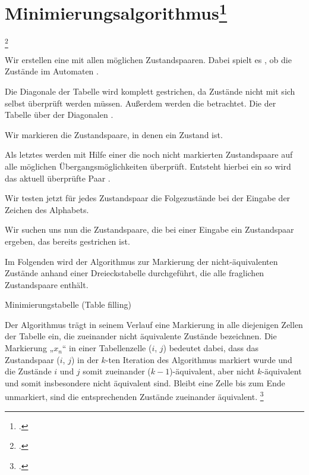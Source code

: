 \documentclass{lehramt-informatik-haupt}
\begin{document}

\section{Minimierungsalgorithmus\footcite[Seite 47-57]{vossen}}

\footcite[Seite 51-62]{theo:fs:1}

Wir erstellen eine  mit allen möglichen
Zustandspaaren. Dabei spielt es , ob die
Zustände im Automaten .

Die Diagonale der Tabelle wird komplett gestrichen, da Zustände nicht
mit sich selbst überprüft werden müssen. Außerdem werden die
 betrachtet. Die 
der Tabelle über der Diagonalen .

Wir markieren die Zustandspaare, in denen ein Zustand  ist.

Als letztes werden mit Hilfe einer  die noch
nicht markierten Zustandspaare auf alle möglichen Übergangsmöglichkeiten
überprüft. Entsteht hierbei ein  so
wird das aktuell überprüfte Paar .

Wir testen jetzt für jedes Zustandspaar die Folgezustände bei der
Eingabe der Zeichen des Alphabets.

Wir suchen uns nun die Zustandspaare, die bei einer Eingabe ein
Zustandspaar ergeben, das bereits gestrichen ist.

Im Folgenden wird der Algorithmus zur Markierung der nicht-äquivalenten
Zustände anhand einer Dreieckstabelle durchgeführt, die alle fraglichen
Zustandspaare enthält.

Minimierungstabelle (Table filling)

Der Algorithmus trägt in seinem Verlauf eine Markierung in alle
diejenigen Zellen der Tabelle ein, die zueinander nicht äquivalente
Zustände bezeichnen. Die Markierung „$x_n$“ in einer Tabellenzelle ($i$,
$j$) bedeutet dabei, dass das Zustandspaar ($i$, $j$) in der $k$-ten
Iteration des Algorithmus markiert wurde und die Zustände $i$ und $j$
somit zueinander ($k - 1$)-äquivalent, aber nicht $k$-äquivalent und
somit insbesondere nicht äquivalent sind. Bleibt eine Zelle bis zum Ende
unmarkiert, sind die entsprechenden Zustände zueinander äquivalent.
\footcite[Seite 19]{koenig}


\literatur
\end{document}
